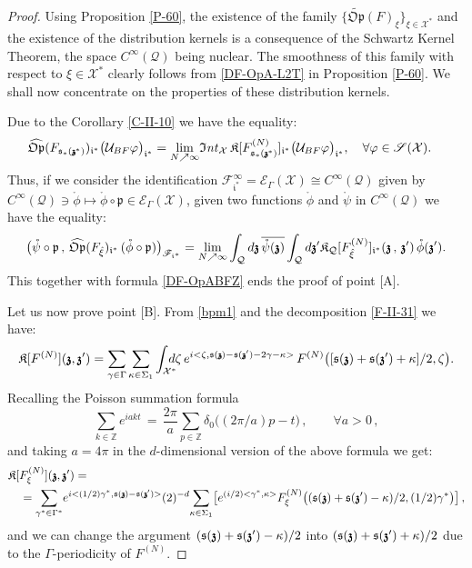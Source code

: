 \documentclass[12pt]{article}
\theoremstyle{definition}
\def\Z{\mathbb{Z}}
\def\Op{\mathfrak{Op}}
\def\X{\mathcal X}
\def\U{\mathcal{U}}
\def\T{\mathcal{Q}}
\def\Int{\mathfrak{I}\mathit{nt}}
\def\p{\mathfrak{p}}
\def\s{\mathfrak{s}}
\def\bz{\mathfrak{z}\hspace*{-4pt}\mathfrak{z}}
\def\beq{\begin{equation}}
\def\eeq{\end{equation}}
\numberwithin{equation}{section}
\begin{document}
\begin{proof}
Using Proposition \ref{P-60}, the existence of the family $\big\{\widetilde{\Op}(F)_{\xi}\big\}_{\xi\in\X^*}$ and the existence of the distribution kernels is a consequence of the Schwartz Kernel Theorem, the space $C^\infty(\T)$ being nuclear. The smoothness of this family with respect to $\xi\in\X^*$ clearly follows from \eqref{DF-OpA-L2T} in Proposition \ref{P-60}. We shall now concentrate on the properties of these distribution kernels.

Due to the Corollary \ref{C-II-10} we have the equality:
\begin{align}
&\widehat{\Op}(F_{\s_*(\bz^*)})_{\mathfrak{i}^*}\big(\U_{BF}\varphi\big)_{\mathfrak{i}^*}=\underset{N\nearrow\infty}{\lim}\Int_{\X}\,\mathfrak{K}[F^{(N)}_{\s_*(\bz^*)}]_{\mathfrak{i}^*}\big(\U_{BF}\varphi\big)_{\mathfrak{i}^*},\quad\forall{\varphi}\in\mathscr{S}(\X).
\end{align}
Thus, if we consider the identification $\mathscr{F}_{\mathfrak{i}^*}^\infty=\mathscr{E}_{\Gamma}(\X)\cong{C}^\infty(\T)$ given by $C^\infty(\T)\ni\mathring\phi\mapsto\mathring{\phi}\circ\p\in\mathscr{E}_{\Gamma}(\X)$, given two functions $\mathring{\phi}$ and $\mathring{\psi}$ in $C^\infty(\T)$ we have the equality:
\beq
\big(\mathring{\psi}\circ\p\,,\,\widehat{\Op}(F_{\hat{\xi}})_{\mathfrak{i}^*}\,(\mathring{\phi}\circ\p)\big)_{\mathscr{F}_{\mathfrak{i}^*}}=\underset{N\nearrow\infty}{\lim}\int_{\T}d\bz\,\overline{\mathring{\psi}(\bz)}\int_{\T}d\bz^\prime\mathfrak{K}_\T[F^{(N)}_{\hat{\xi}}]_{\mathfrak{i}^*}(\bz\,,\,\bz^\prime)\,\mathring{\phi}(\bz^\prime).
\eeq
This together with formula \eqref{DF-OpABFZ} ends the proof of point [A].

Let us now  prove point [B]. From \eqref{bpm1} and the decomposition \eqref{F-II-31} we have:
\begin{align}
	\mathfrak{K}[F^{(N)}](\bz,\bz^\prime)=\underset{\gamma\in\Gamma}{\sum}\,\underset{\kappa\in\Sigma_1}{\sum}\int_{\X^*}\hspace*{-0.3cm}d\zeta\,e^{i<\zeta,\s(\bz)-\s(\bz^\prime)-2\gamma-\kappa>}\,F^{(N)}\big([\s(\bz)+\s(\bz^\prime)+\kappa]/2,\zeta\big).
\end{align}
Recalling the Poisson summation formula 
\beq\label{F-Poisson}
\underset{k\in\Z}{\sum}e^{iakt}\,=\,\frac{2\pi}{a}\underset{p\in\Z}{\sum}\delta_0\big((2\pi/a)p-t\big)\,,\qquad\forall{a}>0\,,
\eeq
and taking $a=4\pi$ in the $d$-dimensional version of the above formula we get:
\beq\begin{split}\label{F-53}
&\mathfrak{K}[F^{(N)}_\xi](\bz,\bz^\prime)=\\
&\quad=\underset{\gamma^*\in\Gamma^*}{\sum}e^{i<(1/2)\gamma^*,\s(\bz)-\s(\bz^\prime)>}(2)^{-d}\underset{\kappa\in\Sigma_1}{\sum}\big[e^{(i/2)<\gamma^*,\kappa>}F^{(N)}_\xi\big((\s(\bz)+\s(\bz^\prime)-\kappa)/2,(1/2)\gamma^*\big)\big]\,,
\end{split}\eeq
and we can change the argument $(\s(\bz)+\s(\bz^\prime)-\kappa)/2$ into ${(\s(\bz)+\s(\bz^\prime)+\kappa)/2}$ due to the $\Gamma$-periodicity of $F^{(N)}$. 


\end{proof}
\end{document}
